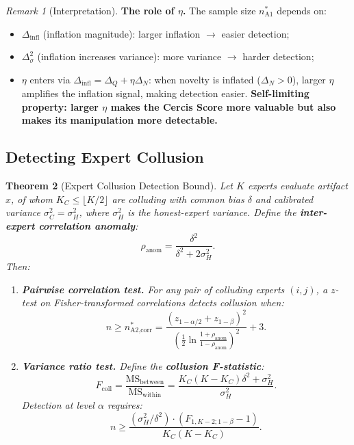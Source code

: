\documentclass[11pt,a4paper]{article}
\theoremstyle{plain}
\newtheorem{theorem}{Theorem}[section]
\theoremstyle{definition}
\theoremstyle{remark}
\newtheorem{remark}[theorem]{Remark}
\begin{document}
\begin{remark}[Interpretation]
  \textbf{The role of \(\eta\).} The sample size \(n_{\text{A1}}^*\) depends on:
  \begin{itemize}
    \item \(\Delta_{\text{infl}}\) (inflation magnitude): larger inflation \(\to\) easier detection;
    \item \(\Delta_\sigma^2\) (inflation increases variance): more variance \(\to\) harder detection;
    \item \(\eta\) enters via \(\Delta_{\text{infl}} = \Delta_Q + \eta \Delta_N\): when novelty is inflated (\(\Delta_N > 0\)), larger \(\eta\) amplifies the inflation signal, making detection easier. \textbf{Self-limiting property: larger \(\eta\) makes the Cercis Score more valuable but also makes its manipulation more detectable.}
  \end{itemize}
\end{remark}

\subsection{Detecting Expert Collusion}
\label{sec:bound_a2}
\begin{theorem}[Expert Collusion Detection Bound]\label{thm:a2_detect}
  Let \(K\) experts evaluate artifact \(x\), of whom \(K_C \leq \lfloor K/2 \rfloor\) are
  colluding with common bias \(\delta\) and calibrated variance \(\sigma_C^2 = \sigma_H^2\),
  where \(\sigma_H^2\) is the honest-expert variance. Define the \textbf{inter-expert
  correlation anomaly}:
  \[ \rho_{\text{anom}} = \frac{\delta^2}{\delta^2 + 2\sigma_H^2}. \]
  Then:
  \begin{enumerate}[label=(\roman*)]
    \item \textbf{Pairwise correlation test.} For any pair of colluding experts \((i,j)\),
          a \(z\)-test on Fisher-transformed correlations detects collusion when:
          \begin{equation}\label{eq:detect_a2_corr}
            n \geq n_{\text{A2,corr}}^* =
            \frac{(z_{1-\alpha/2} + z_{1-\beta})^2}
                 {\left(\frac{1}{2}\ln\frac{1+\rho_{\text{anom}}}{1-\rho_{\text{anom}}}\right)^2} + 3.
          \end{equation}
    \item \textbf{Variance ratio test.} Define the \textbf{collusion F-statistic}:
          \begin{equation}\label{eq:collusion_F}
            F_{\text{coll}} = \frac{\text{MS}_{\text{between}}}{\text{MS}_{\text{within}}}
            = \frac{K_C(K - K_C)\delta^2 + \sigma_H^2}{\sigma_H^2}.
          \end{equation}
          Detection at level \(\alpha\) requires:
          \begin{equation}\label{eq:detect_a2_F}
            n \geq \frac{(\sigma_H^2 / \delta^2) \cdot (F_{1,K-2;1-\beta} - 1)}{K_C(K - K_C)}.
          \end{equation}
  \end{enumerate}
\end{theorem}
\end{document}
